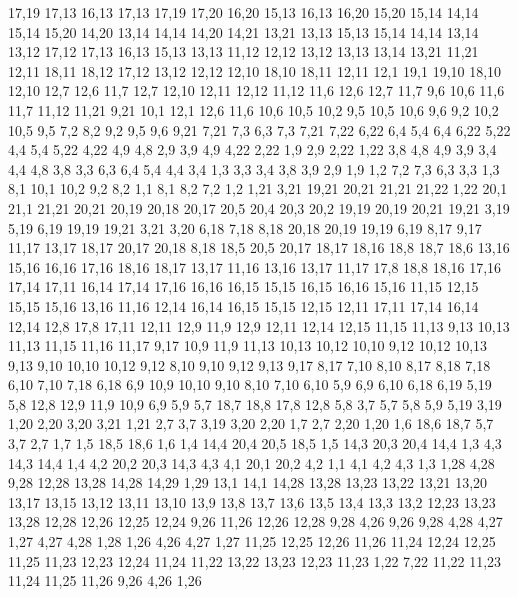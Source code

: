 17,19
17,13
%
16,13
17,13
17,19
17,20
16,20
%
15,13
16,13
16,20
15,20
15,14
%
14,14
15,14
15,20
14,20
%
13,14
14,14
14,20
14,21
13,21
%
13,13
15,13
15,14
14,14
13,14
%
13,12
17,12
17,13
16,13
15,13
13,13
%
11,12
12,12
13,12
13,13
13,14
13,21
11,21
%
12,11
18,11
18,12
17,12
13,12
12,12
%
12,10
18,10
18,11
12,11
%
12,1
19,1
19,10
18,10
12,10
12,7
12,6
%
11,7
12,7
12,10
12,11
12,12
11,12
%
11,6
12,6
12,7
11,7
%
9,6
10,6
11,6
11,7
11,12
11,21
9,21
%
10,1
12,1
12,6
11,6
10,6
10,5
10,2
%
9,5
10,5
10,6
9,6
%
9,2
10,2
10,5
9,5
%
7,2
8,2
9,2
9,5
9,6
9,21
7,21
7,3
%
6,3
7,3
7,21
7,22
6,22
6,4
%
5,4
6,4
6,22
5,22
%
4,4
5,4
5,22
4,22
4,9
4,8
%
2,9
3,9
4,9
4,22
2,22
%
1,9
2,9
2,22
1,22
%
3,8
4,8
4,9
3,9
%
3,4
4,4
4,8
3,8
%
3,3
6,3
6,4
5,4
4,4
3,4
%
1,3
3,3
3,4
3,8
3,9
2,9
1,9
%
1,2
7,2
7,3
6,3
3,3
1,3
%
8,1
10,1
10,2
9,2
8,2
%
1,1
8,1
8,2
7,2
1,2
1,21
3,21
19,21
20,21
21,21
21,22
1,22
%
20,1
21,1
21,21
20,21
20,19
20,18
20,17
20,5
20,4
20,3
20,2
%
19,19
20,19
20,21
19,21
%
3,19
5,19
6,19
19,19
19,21
3,21
3,20
%
6,18
7,18
8,18
20,18
20,19
19,19
6,19
%
8,17
9,17
11,17
13,17
18,17
20,17
20,18
8,18
%
18,5
20,5
20,17
18,17
18,16
18,8
18,7
18,6
%
13,16
15,16
16,16
17,16
18,16
18,17
13,17
%
11,16
13,16
13,17
11,17
%
17,8
18,8
18,16
17,16
17,14
17,11
%
16,14
17,14
17,16
16,16
16,15
%
15,15
16,15
16,16
15,16
%
11,15
12,15
15,15
15,16
13,16
11,16
%
12,14
16,14
16,15
15,15
12,15
%
12,11
17,11
17,14
16,14
12,14
%
12,8
17,8
17,11
12,11
12,9
%
11,9
12,9
12,11
12,14
12,15
11,15
11,13
%
9,13
10,13
11,13
11,15
11,16
11,17
9,17
%
10,9
11,9
11,13
10,13
10,12
10,10
%
9,12
10,12
10,13
9,13
%
9,10
10,10
10,12
9,12
%
8,10
9,10
9,12
9,13
9,17
8,17
%
7,10
8,10
8,17
8,18
7,18
%
6,10
7,10
7,18
6,18
%
6,9
10,9
10,10
9,10
8,10
7,10
6,10
%
5,9
6,9
6,10
6,18
6,19
5,19
%
5,8
12,8
12,9
11,9
10,9
6,9
5,9
%
5,7
18,7
18,8
17,8
12,8
5,8
%
3,7
5,7
5,8
5,9
5,19
3,19
%
1,20
2,20
3,20
3,21
1,21
%
2,7
3,7
3,19
3,20
2,20
%
1,7
2,7
2,20
1,20
%
1,6
18,6
18,7
5,7
3,7
2,7
1,7
%
1,5
18,5
18,6
1,6
%
1,4
14,4
20,4
20,5
18,5
1,5
%
14,3
20,3
20,4
14,4
%
1,3
4,3
14,3
14,4
1,4
%
4,2
20,2
20,3
14,3
4,3
%
4,1
20,1
20,2
4,2
%
1,1
4,1
4,2
4,3
1,3
1,28
4,28
9,28
12,28
13,28
14,28
14,29
1,29
%
13,1
14,1
14,28
13,28
13,23
13,22
13,21
13,20
13,17
13,15
13,12
13,11
13,10
13,9
13,8
13,7
13,6
13,5
13,4
13,3
13,2
%
12,23
13,23
13,28
12,28
12,26
12,25
12,24
%
9,26
11,26
12,26
12,28
9,28
%
4,26
9,26
9,28
4,28
4,27
%
1,27
4,27
4,28
1,28
%
1,26
4,26
4,27
1,27
%
11,25
12,25
12,26
11,26
%
11,24
12,24
12,25
11,25
%
11,23
12,23
12,24
11,24
%
11,22
13,22
13,23
12,23
11,23
%
1,22
7,22
11,22
11,23
11,24
11,25
11,26
9,26
4,26
1,26
%
